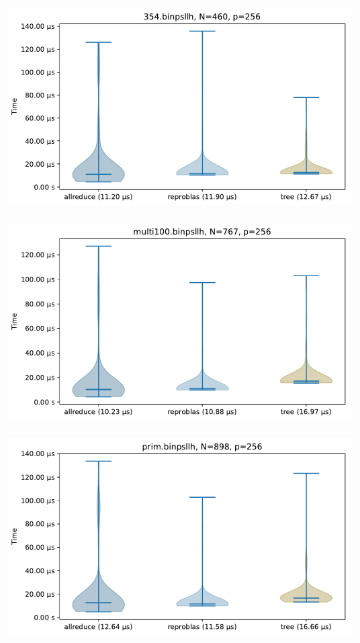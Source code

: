 \begin{figure}
\begin{subfigure}{\textwidth}
\centering
\includegraphics[scale=\mScale]{figures/violin354.pdf}
\end{subfigure}

\begin{subfigure}{\textwidth}
\centering
\includegraphics[scale=\mScale]{figures/violinMulti100.pdf}
\end{subfigure}

\begin{subfigure}{\textwidth}
\centering
\includegraphics[scale=\mScale]{figures/violinPrim.pdf}
\end{subfigure}


\end{figure}
